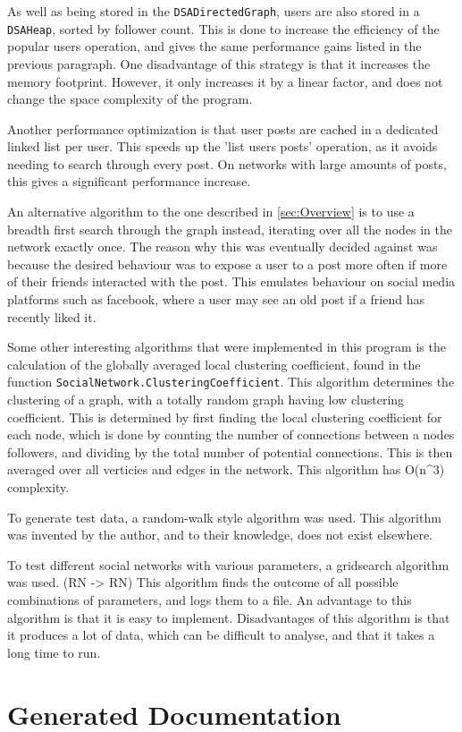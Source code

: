 \documentclass{article}
\begin{document}
As well as being stored in the \texttt{DSADirectedGraph}, users are also stored in a \texttt{DSAHeap},
sorted by follower count. This is done to increase the efficiency of the popular users operation,
and gives the same performance gains listed in the previous paragraph.
One disadvantage of this strategy is that it increases the memory footprint. However, it only increases it
by a linear factor, and does not change the space complexity of the program.

Another performance optimization is that user posts are cached in a dedicated linked list per user.
This speeds up the 'list users posts' operation, as it avoids needing to search through every post. On networks with large amounts
of posts, this gives a significant performance increase.

An alternative algorithm to the one described in \autoref{sec:Overview} is to use a breadth first search through the graph instead,
iterating over all the nodes in the network exactly once. The reason why this was eventually decided against was because
the desired behaviour was to expose a user to a post more often if more of their friends interacted with the post.
This emulates behaviour on social media
platforms such as facebook, where a user may see an old post if a friend has recently liked it.

Some other interesting algorithms that were implemented in this program is the calculation of the globally averaged local clustering coefficient, found in the
function \texttt{SocialNetwork.ClusteringCoefficient}. This algorithm determines the clustering of a graph, with a totally random graph
having low clustering coefficient. This is determined by first finding the local clustering coefficient for each node, which is done by counting
the number of connections between a nodes followers, and dividing by the total number of potential connections. This is then averaged over all
verticies and edges in the network. This algorithm has O(n^3) complexity.

To generate test data, a random-walk style algorithm was used. This algorithm was invented by the author, and to their knowledge, does not exist
elsewhere.

To test different social networks with various parameters, a gridsearch algorithm was used. (RN -> RN) This algorithm finds the outcome of all possible
combinations of parameters, and logs them to a file. An advantage to this algorithm is that it is easy to implement.
Disadvantages of this algorithm is that it produces a lot of data, which can be difficult to analyse, and that it takes a long time to run.

\section{Generated Documentation}
\end{document}
